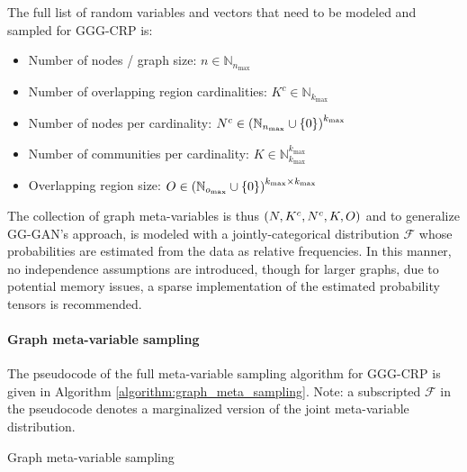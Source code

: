 The full list of random variables and vectors that need to be modeled and sampled for GGG-CRP is:

\begin{itemize}
\item Number of nodes / graph size: $n \in \mathbb{N}_{n_{\max}}$
\item Number of overlapping region cardinalities: $K^c \in \mathbb{N}_{k_{\max}}$
\item Number of nodes per cardinality: $N^c \in \mathopen{}\left(\mathbb{N}_{n_{\max}} \cup \mathopen{}\left\{0\right\}\right)^{k_{\max}}$
\item Number of communities per cardinality: $K \in \mathbb{N}_{k_{\max}}^{k_{\max}}$
\item Overlapping region size: $O \in \mathopen{}\left(\mathbb{N}_{o_{\max}} \cup \mathopen{}\left\{0\right\}\right)^{k_{\max} \times k_{\max}}$
\end{itemize}

The collection of graph meta-variables is thus $\mathopen{}\left(N, K^c, N^c, K, O\right)$ and to generalize GG-GAN's approach, is modeled with a jointly-categorical distribution $\mathcal{F}$ whose probabilities are estimated from the data as relative frequencies. In this manner, no independence assumptions are introduced, though for larger graphs, due to potential memory issues, a sparse implementation of the estimated probability tensors is recommended.

\paragraph{Graph meta-variable sampling}

The pseudocode of the full meta-variable sampling algorithm for GGG-CRP is given in Algorithm \ref{algorithm:graph_meta_sampling}. Note: a subscripted $\mathcal{F}$ in the pseudocode denotes a marginalized version of the joint meta-variable distribution.
\begin{algorithm}[H]
\caption{Graph meta-variable sampling}
\label{algorithm:graph_meta_sampling}
\begin{algorithmic}
\ENDFOR
{}
\end{algorithmic}
\end{algorithm} 


